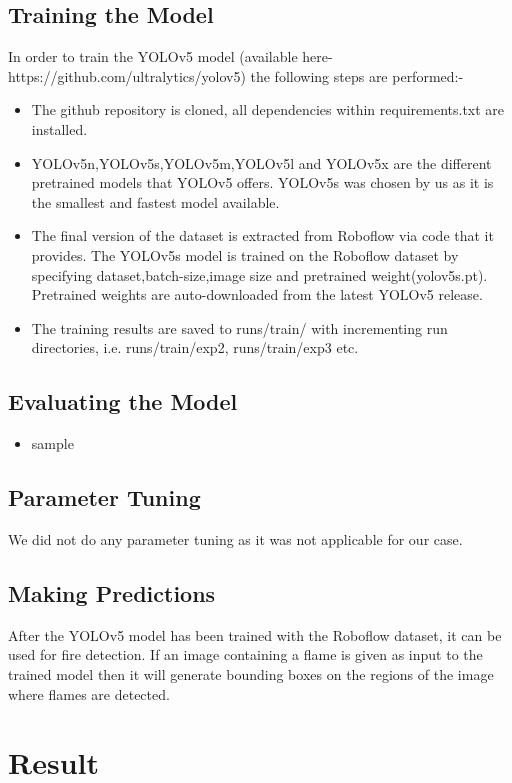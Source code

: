 \documentclass[conference]{IEEEtran}
\begin{document}
\subsection{Training the Model}
 In order to train the YOLOv5 model (available here-https://github.com/ultralytics/yolov5) the following steps are performed:-
 \begin{itemize}
 \item The github repository is cloned, all dependencies within requirements.txt are installed.
 \item YOLOv5n,YOLOv5s,YOLOv5m,YOLOv5l and YOLOv5x are the different pretrained models that YOLOv5 offers. YOLOv5s was chosen by us as it is the smallest and fastest model available.
 \item The final version of the dataset is extracted from Roboflow via code that it provides. The YOLOv5s model is trained on the Roboflow dataset by specifying dataset,batch-size,image size and pretrained weight(yolov5s.pt). Pretrained weights are auto-downloaded from the latest YOLOv5 release.
 \item The training results are saved to runs/train/ with incrementing run directories, i.e. runs/train/exp2, runs/train/exp3 etc.
\end{itemize} 


\subsection{Evaluating the Model}
\begin{itemize}
\item sample
\end{itemize}

\subsection{Parameter Tuning}
 We did not do any parameter tuning as it was not applicable for our case.
 
 \subsection{Making Predictions}
  After the YOLOv5 model has been trained with the Roboflow dataset, it can be used for fire detection. If an image containing a flame is given as input to the trained model then it will generate bounding boxes on the regions of the image where flames are detected.
 
 


\section*{Result}
\end{document}
